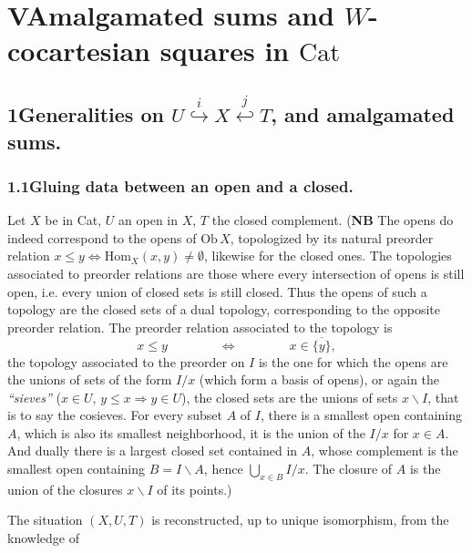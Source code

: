 \documentclass[11pt]{article}
\newcommand{\printedpage}[1]{\marginpar{\footnotesize p.~#1}}
\newcommand{\msp}[1]{\marginpar{\footnotesize [#1]}}
\begin{document}
\printedpage{43}

\msp{page 59}

\section*{V\quad Amalgamated sums and $W$-cocartesian squares in $\mathrm{Cat}$}

\subsection*{1\quad Generalities on $U \overset{i}{\hookrightarrow} X \overset{j}{\hookleftarrow} T$, and amalgamated sums.}

\subsubsection*{1.1\quad Gluing data between an open and a closed.}

Let $X$ be in Cat, $U$ an open in $X$, $T$ the closed complement. (\textbf{NB} The opens do indeed correspond to the opens of $\mathrm{Ob}\,X$, topologized by its natural preorder relation $x \leq y \iff \mathrm{Hom}_X(x,y) \neq \emptyset$, likewise for the closed ones. The topologies associated to preorder relations are those where every intersection of opens is still open, i.e. every union of closed sets is still closed. Thus the opens of such a topology are the closed sets of a dual topology, corresponding to the opposite preorder relation. The preorder relation associated to the topology is
\[
x \leq y \qquad\qquad \iff \qquad\qquad x \in \overline{\{y\}},
\]
the topology associated to the preorder on $I$ is the one for which the opens are the unions of sets of the form $I/x$ (which form a basis of opens), or again the \textit{``sieves''} ($x \in U$, $y \leq x \Longrightarrow y \in U$), the closed sets are the unions of sets $x\backslash I$, that is to say the cosieves. For every subset $A$ of $I$, there is a smallest open containing $A$, which is also its smallest neighborhood, it is the union of the $I/x$ for $x \in A$. And dually there is a largest closed set contained in $A$, whose complement is the smallest open containing $B = I\backslash A$, hence $\bigcup_{x\in B} I/x$. The closure of $A$ is the union of the closures $x\backslash I$ of its points.)

\msp{page 60}

The situation $(X,U,T)$ is reconstructed, up to unique isomorphism, from the knowledge of
\end{document}

